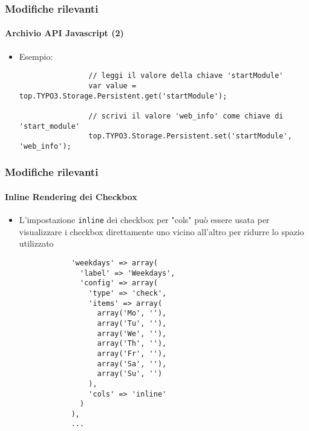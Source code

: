 \begin{frame}[fragile]
	\frametitle{Modifiche rilevanti}
	\framesubtitle{Archivio API Javascript (2)}

	\begin{itemize}
		\item Esempio:
			\begin{lstlisting}
				// leggi il valore della chiave 'startModule'
				var value = top.TYPO3.Storage.Persistent.get('startModule');

				// scrivi il valore 'web_info' come chiave di 'start_module'
				top.TYPO3.Storage.Persistent.set('startModule', 'web_info');
			\end{lstlisting}

	\end{itemize}

\end{frame}


\begin{frame}[fragile]
	\frametitle{Modifiche rilevanti}
	\framesubtitle{Inline Rendering dei Checkbox}

	\lstset{basicstyle=\tiny\ttfamily}

	\begin{itemize}

		\item L'impostazione \texttt{inline} dei checkbox per "cols" può essere usata per visualizzare i checkbox
			direttamente uno vicino all'altro per ridurre lo spazio utilizzato 

		\begin{lstlisting}
			'weekdays' => array(
			  'label' => 'Weekdays',
			  'config' => array(
			    'type' => 'check',
			    'items' => array(
			      array('Mo', ''),
			      array('Tu', ''),
			      array('We', ''),
			      array('Th', ''),
			      array('Fr', ''),
			      array('Sa', ''),
			      array('Su', '')
			    ),
			    'cols' => 'inline'
			  )
			),
			...
		\end{lstlisting}

	\end{itemize}

\end{frame}

